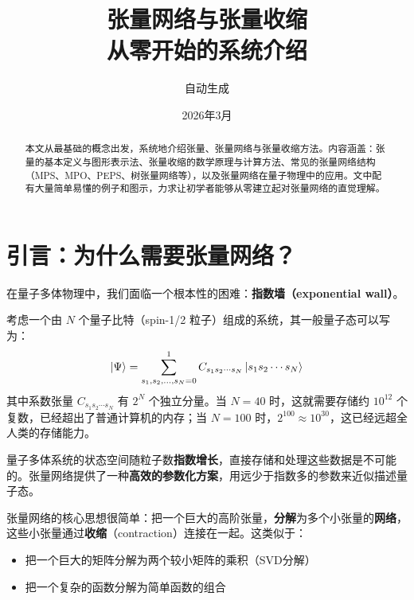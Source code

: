 \documentclass[12pt,a4paper]{ctexart}
\title{\Huge\bfseries 张量网络与张量收缩\\[0.5em]
\Large 从零开始的系统介绍}
\author{自动生成}
\date{2026年3月}
\begin{document}
\maketitle
\thispagestyle{empty}

\vfill
\begin{abstract}
本文从最基础的概念出发，系统地介绍张量、张量网络与张量收缩方法。内容涵盖：张量的基本定义与图形表示法、张量收缩的数学原理与计算方法、常见的张量网络结构（MPS、MPO、PEPS、树张量网络等），以及张量网络在量子物理中的应用。文中配有大量简单易懂的例子和图示，力求让初学者能够从零建立起对张量网络的直觉理解。
\end{abstract}
\vfill

\newpage
\tableofcontents
\newpage

\section{引言：为什么需要张量网络？}

在量子多体物理中，我们面临一个根本性的困难：\textbf{指数墙（exponential wall）}。

考虑一个由 $N$ 个量子比特（spin-1/2 粒子）组成的系统，其一般量子态可以写为：
\begin{equation}
    \ket{\Psi} = \sum_{s_1, s_2, \ldots, s_N = 0}^{1} C_{s_1 s_2 \cdots s_N} \ket{s_1 s_2 \cdots s_N}
\end{equation}
其中系数张量 $C_{s_1 s_2 \cdots s_N}$ 有 $2^N$ 个独立分量。当 $N=40$ 时，这就需要存储约 $10^{12}$ 个复数，已经超出了普通计算机的内存；当 $N=100$ 时，$2^{100} \approx 10^{30}$，这已经远超全人类的存储能力。

\begin{keybox}[核心问题]
量子多体系统的状态空间随粒子数\textbf{指数增长}，直接存储和处理这些数据是不可能的。张量网络提供了一种\textbf{高效的参数化方案}，用远少于指数多的参数来近似描述量子态。
\end{keybox}

张量网络的核心思想很简单：把一个巨大的高阶张量，\textbf{分解}为多个小张量的\textbf{网络}，这些小张量通过\textbf{收缩}（contraction）连接在一起。这类似于：
\begin{itemize}
    \item 把一个巨大的矩阵分解为两个较小矩阵的乘积（SVD分解）
    \item 把一个复杂的函数分解为简单函数的组合
\end{itemize}
\end{document}
